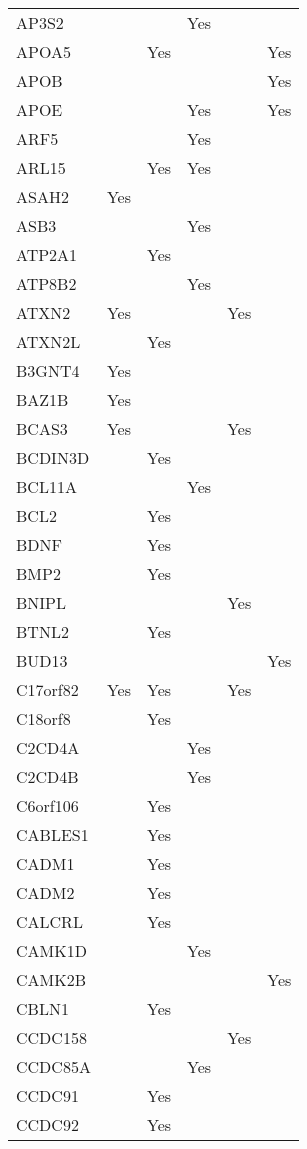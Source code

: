 \documentclass[twoside,openright]{report}
\begin{document}
\begin{appendices}
\begin{longtable}[t]{llllll}
AP3S2 &  &  & Yes &  & \\
APOA5 &  & Yes &  &  & Yes\\
APOB &  &  &  &  & Yes\\
APOE &  &  & Yes &  & Yes\\
ARF5 &  &  & Yes &  & \\
ARL15 &  & Yes & Yes &  & \\
ASAH2 & Yes &  &  &  & \\
ASB3 &  &  & Yes &  & \\
ATP2A1 &  & Yes &  &  & \\
ATP8B2 &  &  & Yes &  & \\
ATXN2 & Yes &  &  & Yes & \\
ATXN2L &  & Yes &  &  & \\
B3GNT4 & Yes &  &  &  & \\
BAZ1B & Yes &  &  &  & \\
BCAS3 & Yes &  &  & Yes & \\
BCDIN3D &  & Yes &  &  & \\
BCL11A &  &  & Yes &  & \\
BCL2 &  & Yes &  &  & \\
BDNF &  & Yes &  &  & \\
BMP2 &  & Yes &  &  & \\
BNIPL &  &  &  & Yes & \\
BTNL2 &  & Yes &  &  & \\
BUD13 &  &  &  &  & Yes\\
C17orf82 & Yes & Yes &  & Yes & \\
C18orf8 &  & Yes &  &  & \\
C2CD4A &  &  & Yes &  & \\
C2CD4B &  &  & Yes &  & \\
C6orf106 &  & Yes &  &  & \\
CABLES1 &  & Yes &  &  & \\
CADM1 &  & Yes &  &  & \\
CADM2 &  & Yes &  &  & \\
CALCRL &  & Yes &  &  & \\
CAMK1D &  &  & Yes &  & \\
CAMK2B &  &  &  &  & Yes\\
CBLN1 &  & Yes &  &  & \\
CCDC158 &  &  &  & Yes & \\
CCDC85A &  &  & Yes &  & \\
CCDC91 &  & Yes &  &  & \\
CCDC92 &  & Yes &  &  & \\

\end{longtable}
\end{appendices}
\end{document}
